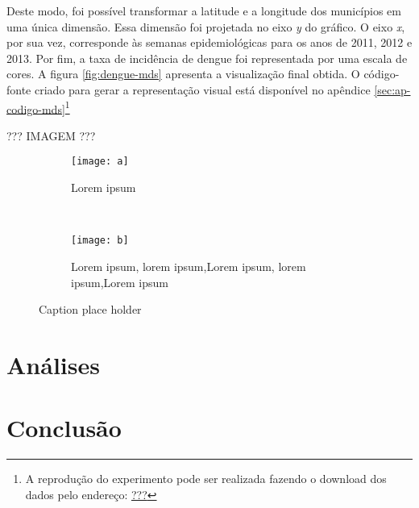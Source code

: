 \documentclass[12pt,openright,twoside,a4paper,article,brazil]{abntex2}
\begin{document}
Deste modo, foi possível transformar a latitude e a longitude dos municípios em uma única dimensão. Essa dimensão foi projetada no eixo \emph{y} do gráfico. O eixo \emph{x}, por sua vez, corresponde às semanas epidemiológicas para os anos de 2011, 2012 e 2013. Por fim, a taxa de incidência de dengue foi representada por uma escala de cores. A figura \ref{fig:dengue-mds} apresenta a visualização final obtida. O código-fonte criado para gerar a representação visual está disponível no apêndice \ref{sec:ap-codigo-mds}\footnote{A reprodução do experimento pode ser realizada fazendo o download dos dados pelo endereço: \url{???}}

??? IMAGEM ???

\begin{figure*}[t!]
    \centering
    \begin{subfigure}[b]{0.5\textwidth}
        \centering
        \texttt{[image: a]}
        \caption{Lorem ipsum}
    \end{subfigure}%
    ~
    \begin{subfigure}[b]{0.5\textwidth}
        \centering
        \texttt{[image: b]}
        \caption{Lorem ipsum, lorem ipsum,Lorem ipsum, lorem ipsum,Lorem ipsum}
    \end{subfigure}
    \caption{Caption place holder}
\end{figure*}





\section{Análises}
\label{sec:analises}



\section{Conclusão}
\label{sec:conclusao}



\backmatter

\postextual


\end{document}
